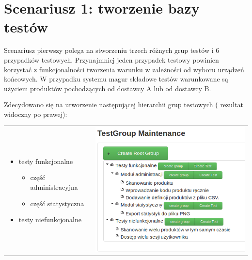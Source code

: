 \section{Scenariusz 1: tworzenie bazy testów}
Scenariusz pierwszy polega na stworzeniu trzech różnych grup testów i 6 przypadków testowych. Przynajmniej jeden przypadek testowy powinien korzystać z funkcjonalności tworzenia warunku w zależności od wyboru urządzeń końcowych. W przypadku systemu magur składowe testów warunkowane są użyciem produktów pochodzących od dostawcy A lub od dostawcy B.

Zdecydowano się na utworzenie następującej hierarchii grup testowych ( rezultat widoczny po prawej):


\begin{tabular}{l l}
\begin{minipage}{0.5\textwidth}
\begin{itemize}
    \item testy funkcjonalne
    \begin{itemize}
      \item część administracyjna
      \item część statystyczna      
    \end{itemize}
    \item testy niefunkcjonalne
  \end{itemize}
\end{minipage}
&
\begin{minipage}{0.5\textwidth}
              \includegraphics[width=\linewidth]{img/screen/listaTestow.png}            
          
\end{minipage}

\end{tabular}

